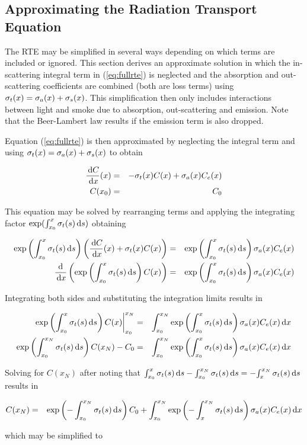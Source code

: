 \subsection{Approximating the Radiation Transport Equation}

The RTE may be simplified in several ways depending on which terms
are included or ignored.  This section derives an approximate
solution in which the in-scattering integral term in
(\ref{eq:fullrte}) is neglected and the absorption and
out-scattering coefficients are combined (both are loss terms)
using $\sigma_t(x)=\sigma_a(x)+\sigma_s(x)$.  This simplification then only includes
interactions between light and smoke due to absorption,
out-scattering and emission.  Note that the Beer-Lambert law
results if the emission term is also dropped.

Equation (\ref{eq:fullrte}) is then approximated by neglecting the
integral term and using $\sigma_t(x)=\sigma_a(x)+\sigma_s(x)$ to obtain

\begin{eqnarray}
\frac{\,\mbox{d}C}{\,\mbox{d}x}(x)&=&-\sigma_t(x) C(x) + \sigma_a(x) C_e(x)\\
 C(x_0)&=&C_0
\end{eqnarray}

This equation may be solved by rearranging terms and applying the
integrating factor $\exp(\int_{x_0}^x \sigma_t(s) \,\mbox{d}s)$ obtaining

\begin{eqnarray}
\exp\left({\int_{x_0}^{x} \sigma_t(s) \,\mbox{d}s}\right)\left(\frac{\,\mbox{d}C}{\,\mbox{d}x}(x)+\sigma_t(x) C(x)\right)&=&  \exp\left({\int_{x_0}^{x} \sigma_t(s) \,\mbox{d}s}\right)\sigma_a(x) C_e(x)\\
\frac{\mbox{d}}{\,\mbox{d}x}\left(\exp\left({\int_{x_0}^{x} \sigma_t(s) \,\mbox{d}s}\right) C(x)\right)&=& \exp\left({\int_{x_0}^{x} \sigma_t(s) \,\mbox{d}s}\right)\sigma_a(x) C_e(x)
\end{eqnarray}

Integrating both sides and substituting the integration limits
results in

\begin{eqnarray}
\left.\exp\left({\int_{x_0}^{x} \sigma_t(s) \,\mbox{d}s}\right) C(x)\right|_{x_0}^{x_N}&=& \int_{x_0}^{x_N}\exp\left({\int_{x_0}^{x} \sigma_t(s) \,\mbox{d}s}\right)\sigma_a(x) C_e(x) \,\mbox{d}x \\
\exp\left({\int_{x_0}^{x_N} \sigma_t(s) \,\mbox{d}s}\right) C(x_N)-C_0&=& \int_{x_0}^{x_N}\exp\left({\int_{x_0}^{x} \sigma_t(s) \,\mbox{d}s}\right)\sigma_a(x) C_e(x) \,\mbox{d}x
\end{eqnarray}

Solving for $C(x_N)$ after noting that
${\int_{x_0}^{x} \sigma_t(s) \,\mbox{d}s}-{\int_{x_0}^{x_N} \sigma_t(s) \,\mbox{d}s}=-{\int_{x}^{x_N} \sigma_t(s) \,\mbox{d}s}$ results in

\begin{eqnarray}
C(x_N)&=&\exp\left({-\int_{x_0}^{x_N} \sigma_t(s) \,\mbox{d}s}\right) C_0+ \int_{x_0}^{x_N}\exp\left({-\int_{x}^{x_N} \sigma_t(s) \,\mbox{d}s}\right)\sigma_a(x)
C_e(x) \,\mbox{d}x
\end{eqnarray}

\noindent which may be simplified to

